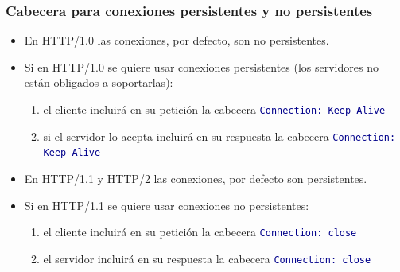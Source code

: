 \documentclass[hyperref={pdfpagelabels=true},ucs]{beamer}
\begin{document}










\begin{frame}[fragile]
\frametitle{Cabecera para conexiones persistentes y no persistentes}

\begin{itemize}

\item En HTTP/1.0 las conexiones, por defecto, son no persistentes.
\item Si en HTTP/1.0 se quiere usar conexiones persistentes (los
  servidores no están obligados a soportarlas):
  \begin{enumerate}
  \item el cliente incluirá en su petición la cabecera
    \textcolor{darkblue}{\Verb|Connection: Keep-Alive|}
  \item si el servidor lo acepta incluirá en su respuesta la cabecera
    \textcolor{darkblue}{\Verb|Connection: Keep-Alive|}
  \end{enumerate}

\item En HTTP/1.1 y HTTP/2 las conexiones, por defecto son persistentes.
\item Si en HTTP/1.1 se quiere usar conexiones no persistentes:
  \begin{enumerate}
  \item el cliente incluirá en su petición la cabecera     
    \textcolor{darkblue}{\Verb|Connection: close|}
  \item el servidor incluirá en su respuesta la cabecera     
    \textcolor{darkblue}{\Verb|Connection: close|}
  \end{enumerate}

\end{itemize}


\end{frame}
\end{document}
